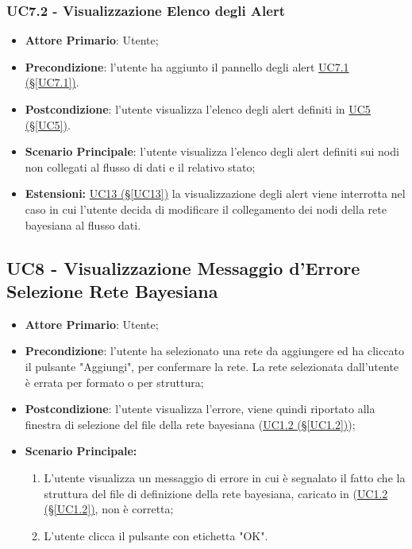 \subsubsection{UC7.2 - Visualizzazione Elenco degli Alert}\label{UC7.2}
\begin{itemize}
	\item \textbf{Attore Primario}: Utente;
	\item \textbf{Precondizione}:  l'utente ha aggiunto il pannello degli alert \hyperref[UC7.1]{UC7.1 (§\ref*{UC7.1})}.
	\item \textbf{Postcondizione}: l'utente visualizza l'elenco degli alert definiti in  \hyperref[UC5]{UC5 (§\ref*{UC5})}.
	\item \textbf{Scenario Principale}: l'utente visualizza l'elenco degli alert definiti sui nodi non collegati al flusso di dati e il relativo stato;
	\item \textbf{Estensioni:} \hyperref[UC13]{UC13 (§\ref*{UC13})} la visualizzazione degli alert viene interrotta nel caso in cui l'utente decida di modificare il collegamento dei nodi della rete bayesiana al flusso dati.
\end{itemize}


\pagebreak

\subsection{UC8 - Visualizzazione Messaggio d'Errore Selezione Rete Bayesiana}\label{UC8}
\begin{itemize}
\item \textbf{Attore Primario}: Utente;
\item \textbf{Precondizione}: l'utente ha selezionato una rete da aggiungere ed ha cliccato il pulsante "Aggiungi", per confermare la rete. La rete selezionata dall'utente è errata per formato o per struttura;
\item \textbf{Postcondizione}: l'utente visualizza l'errore, viene quindi riportato alla finestra di selezione del file della rete bayesiana (\hyperref[UC1.2]{UC1.2 (§\ref*{UC1.2})});
\item \textbf{Scenario Principale:} 
	\begin{enumerate}
	\item L'utente visualizza un messaggio di errore in cui è segnalato il fatto che la struttura del file di definizione della rete bayesiana, caricato in (\hyperref[UC1.2]{UC1.2 (§\ref*{UC1.2})}, non è corretta;
	\item L'utente clicca il pulsante con etichetta "OK".
	\end{enumerate}
\end{itemize}

